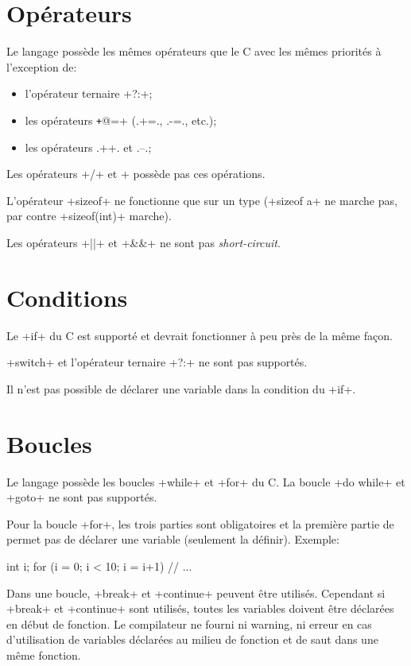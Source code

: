 \documentclass[a4paper]{article}
\begin{document}
  \section{Opérateurs}
    Le langage possède les mêmes opérateurs que le C avec les mêmes priorités à
    l'exception de:
    \begin{itemize}
      \item l'opérateur ternaire \imoc+?:+;
      \item les opérateurs \texttt+@=+ (\imoc.+=., \imoc.-=., etc.);
      \item les opérateurs \imoc.++. et \imoc.--.;
    \end{itemize}

    Les opérateurs \imoc+/+ et \imoc+%
    possède pas ces opérations.

    L'opérateur \imoc+sizeof+ ne fonctionne que sur un type (\imoc+sizeof a+ ne
    marche pas, par contre \imoc+sizeof(int)+ marche).

    Les opérateurs \imoc+||+ et \imoc+&&+ ne sont pas \emph{short-circuit}.

  \section{Conditions}
    Le \imoc+if+ du C est supporté et devrait fonctionner à peu près de la même
    façon.

    \imoc+switch+ et l'opérateur ternaire \imoc+?:+ ne sont pas supportés.

    Il n'est pas possible de déclarer une variable dans la condition du
    \imoc+if+.

  \section{Boucles}
    Le langage possède les boucles \imoc+while+ et \imoc+for+ du C. La boucle
    \imoc+do {} while+ et \imoc+goto+ ne sont pas supportés.

    Pour la boucle \imoc+for+, les trois parties sont obligatoires et la
    première partie de permet pas de déclarer une variable (seulement la
    définir). Exemple:

    \begin{moc}
int i;
for (i = 0; i < 10; i = i+1) {
    // ...
}
    \end{moc}

    Dans une boucle, \imoc+break+ et \imoc+continue+ peuvent être utilisés.
    Cependant si \imoc+break+ et \imoc+continue+ sont utilisés, toutes les
    variables doivent être déclarées en début de fonction. Le compilateur ne
    fourni ni warning, ni erreur en cas d'utilisation de variables déclarées au
    milieu de fonction et de saut dans une même fonction.
\end{document}
